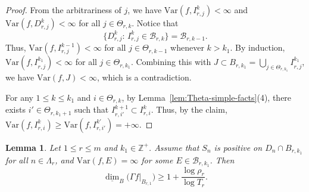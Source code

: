 \documentclass[11pt]{amsart}
\newtheorem{lem}[thm]{Lemma}
\theoremstyle{definition}
\theoremstyle{remark}
\numberwithin{equation}{section}
\newcommand{\bZp}{{{\mathbb Z}^+}}
\newcommand{\mB}{{\mathcal B}}
\newcommand{\uprho}{{{\rho}}}
\newcommand{\Var}{\mathrm{Var}}
\def\lowdimB{\underline{\dim}_B}
\begin{document}
\begin{proof}
    From the arbitrariness of $j$, we have $ \Var(f,I_{r,j}^k) <\infty$ and $ \Var(f,D_{r,j}^k) <\infty$ for all $j \in \Theta_{r,k}$.
    Notice that
    \[
    \big\{  D_{r,j}^k:\, I_{r,j}^k \in \mB_{r,k}\big\} = \mB_{r,k-1}.
    \]
    Thus, $ \Var(f,I_{r,j}^{k-1}) <\infty$ for all $j \in \Theta_{r,k-1}$ whenever $k> k_1$. 
    By induction, $\Var(f,I_{r,j}^{k_1})<\infty$ for all $j\in \Theta_{r,k_1}$. Combining this with $J\subset B_{r,k_1}=\bigcup_{j\in \Theta_{r,k_1}}I_{r,j}^{k_1}$, we have $\Var(f,J)<\infty$, which is a contradiction. 
    
    
    For any $1\leq k\leq k_1$ and $i\in \Theta_{r,k}$, by Lemma~\ref{lem:Theta-simple-facts}(4), there exists $i'\in \Theta_{r,k_1+1}$ such that $I_{r,i'}^{k+1}\subset I_{r,i}^k$. Thus, by the claim, $\Var(f,I_{r,i}^k)\geq \Var(f,I_{r,i'}^{k'})=+\infty$.
\end{proof}





\begin{lem}\label{thm:box-low-con-1}
	Let $1 \leq r \leq m$ and $k_1\in\bZp$. Assume that $S_n$ is positive on $D_n \cap B_{r,k_1}$ for all $n\in \Lambda_r$, and $\Var(f,E)=\infty$ for some $E \in \mathcal{B}_{r,k_1}$. Then 
	\begin{equation}\label{eq:lem4.13-1}
		\lowdimB \big( \Gamma f|_{B_{r,1}}\big) 
		\geq 1+ \frac{\log \uprho_r}{ \log T_r } .
	\end{equation}
\end{lem}
\end{document}

